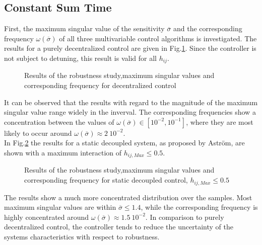 \subsection{Constant Sum Time}
\label{c:montecarlo:ss:sumtime_mimo}

First, the maximum singular value of the sensitivity $\overline{\sigma}$ and the corresponding frequency $\omega\left(\overline{\sigma}\right)$ of all three multivariable control algorithms is investigated. The results for a purely decentralized control are given in Fig.\ref{c:montecarlo:f:msv_rga_tsum}. Since the controller is not subject to detuning, this result is valid for all $h_{ij}$.

\begin{figure}[H]\centering

\caption{Results of the robustness study,maximum singular values and corresponding frequency for decentralized control}
\label{c:montecarlo:f:msv_rga_tsum}
\end{figure}

It can be observed that the results with regard to the magnitude of the maximum singular value range widely in the inverval. The corresponding frequencies show a concentration between the values of $\omega\left(\overline{\sigma}\right) \in \left[10^{-2}, 10^{-1} \right]$, where they are most likely to occur around $\omega\left(\overline{\sigma}\right) \approx 2~10^{-2}$. \\

In Fig.\ref{c:montecarlo:f:msv_a_tsum} the results for a static decoupled system, as proposed by Astr\"om, are shown with a maximum interaction of $h_{ij,Max} \leq 0.5$.

\begin{figure}[H]\centering

\caption{Results of the robustness study,maximum singular values and corresponding frequency for static decoupled control, $h_{ij,Max} \leq 0.5$}
\label{c:montecarlo:f:msv_a_tsum}
\end{figure}

The results show a much more concentrated distribution over the samples. Most maximum singular values are within $\overline{\sigma} \leq 1.4$, while the corresponding frequency is highly concentrated around $\omega\left(\overline{\sigma}\right) \approx 1.5~10^{-2}$. In comparison to purely decentralized control, the controller tends to reduce the uncertainty of the systems characteristics with respect to robustness.\\

